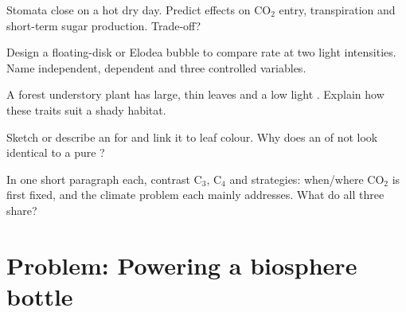 \begin{exercise}[$\star\star$]\label{exo:g10:photosynthesis:9}
Stomata close on a hot dry day. Predict effects on $\mathrm{CO_2}$ entry,
transpiration and short-term sugar production. Trade-off?
\end{exercise}

\begin{exercise}[$\star\star\star$]\label{exo:g10:photosynthesis:10}
Design a floating-disk or Elodea bubble  to compare
 rate at two light intensities. Name independent,
dependent and three controlled variables.
\end{exercise}

\begin{exercise}[$\star\star\star$]\label{exo:g10:photosynthesis:11}
A forest understory plant has large, thin leaves and a low light
. Explain how these traits suit a shady habitat.
\end{exercise}

\begin{exercise}[$\star\star$]\label{exo:g10:photosynthesis:12}
Sketch or describe an  for  and link it to
leaf colour. Why does an  of  not look
identical to a pure  ?
\end{exercise}

\begin{exercise}[$\star\star\star$]\label{exo:g10:photosynthesis:13}
In one short paragraph each, contrast C$_3$, C$_4$ and  strategies:
when/where $\mathrm{CO_2}$ is first fixed, and the climate problem each
mainly addresses. What do all three share?
\end{exercise}

\section{Problem: Powering a biosphere bottle}


